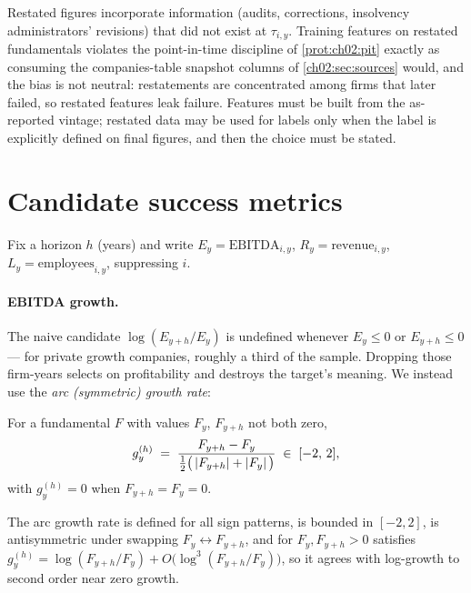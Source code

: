 \begin{warning}\label{warn:success-vintage}
Restated figures incorporate information (audits, corrections, insolvency administrators'
revisions) that did not exist at $\tau_{i,y}$. Training features on restated fundamentals
violates the point-in-time discipline of \cref{prot:ch02:pit} exactly as consuming the
companies-table snapshot columns of \cref{ch02:sec:sources} would, and the bias is not neutral:
restatements are concentrated among firms that later failed, so restated features leak failure.
Features must be built from the as-reported vintage; restated data may be used for labels only
when the label is explicitly defined on final figures, and then the choice must be stated.
\end{warning}

\section{Candidate success metrics}\label{cheu:sec:metrics}

Fix a horizon $h$ (years) and write $E_y = \text{EBITDA}_{i,y}$, $R_y = \text{revenue}_{i,y}$,
$L_y = \text{employees}_{i,y}$, suppressing $i$.

\paragraph{EBITDA growth.} The naive candidate $\log(E_{y+h}/E_y)$ is undefined whenever $E_y
\le 0$ or $E_{y+h} \le 0$ --- for private growth companies, roughly a third of the sample.
Dropping those firm-years selects on profitability and destroys the target's meaning. We
instead use the \emph{arc (symmetric) growth rate}:

\begin{definition}\label{def:success-arc}
For a fundamental $F$ with values $F_y$, $F_{y+h}$ not both zero,
\begin{equation}\label{eq:success-arc}
g^{(h)}_y \;=\; \frac{F_{y+h} - F_y}{\tfrac{1}{2}\big(\left|F_{y+h}\right| +
\left|F_y\right|\big)} \;\in\; [-2,\, 2],
\end{equation}
with $g^{(h)}_y = 0$ when $F_{y+h} = F_y = 0$.
\end{definition}

\begin{proposition}\label{prop:success-arc}
The arc growth rate is defined for all sign patterns, is bounded in $[-2,2]$, is antisymmetric
under swapping $F_y \leftrightarrow F_{y+h}$, and for $F_y, F_{y+h} > 0$ satisfies $g^{(h)}_y =
\log(F_{y+h}/F_y) + O\big(\log^3(F_{y+h}/F_y)\big)$, so it agrees with log-growth to second
order near zero growth.
\end{proposition}

